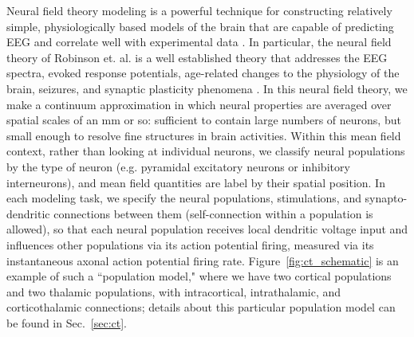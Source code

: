 \documentclass[preprint,review,10pt,authoryear,letterpaper]{elsarticle}
\begin{document}
Neural field theory modeling is a powerful technique for constructing relatively simple, physiologically based models of the brain that are capable of predicting EEG and correlate well with experimental data \cite{Deco2008,Pinotsis2012}. In particular, the neural field theory of Robinson et. al. is a well established theory that addresses the EEG spectra, evoked response potentials, age-related changes to the physiology of the brain, seizures, and synaptic plasticity phenomena \citep{Robinson2005,Rowe2004413,PhysRevE.63.021903,PhysRevE.65.041924,Robinson:04aa,PhysRevE.68.021922,PhysRevE.70.011911,VanAlbada2010,Rennie2002,ker11,Breakspear2006}. In this neural field theory, we make a continuum approximation in which neural properties are averaged over spatial scales of an mm or so: sufficient to contain large numbers of neurons, but small enough to resolve fine structures in brain activities. Within this mean field context, rather than looking at individual neurons, we classify neural populations by the type of neuron (e.g. pyramidal excitatory neurons or inhibitory interneurons), and mean field quantities are label by their spatial position. In each modeling task, we specify the neural populations, stimulations, and synapto-dendritic connections between them (self-connection within a population is allowed), so that each neural population receives local dendritic voltage input and influences other populations via its action potential firing, measured via its instantaneous axonal action potential firing rate. Figure~\ref{fig:ct_schematic} is an example of such a ``population model," where we have two cortical populations and two thalamic populations, with intracortical, intrathalamic, and corticothalamic connections; details about this particular population model can be found in Sec.~\ref{sec:ct}.
\end{document}
